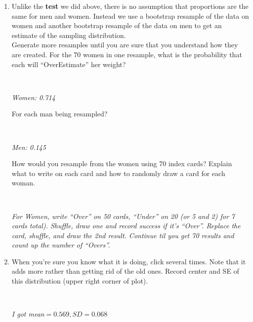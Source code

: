 \begin{enumerate}
\begin{enumerate}
       \item  Unlike the {\bf test} we did above, there is no assumption
         that proportions are the same for men and women.  Instead we
         use a bootstrap resample of the data on women and another bootstrap
         resample of the data on men to get an estimate of the
         sampling distribution. 
            \\  Generate more resamples until you are sure that you
            understand how they are created. For the 70 women in one
            resample, what is the probability that each will 
            ``OverEstimate'' her weight? 
\begin{students}
 \ \   \vspace*{1cm}\\
\end{students}
\begin{key}
  {\it Women: 0.714}\\
\end{key}  
For each man being resampled? 
\begin{students}
 \ \   \vspace*{1cm}\\
\end{students}
\begin{key}
  {\it  Men: 0.145}\\
\end{key} 

         How would you  resample from the women using 70 index cards?  Explain
         what to write on each card and how to randomly draw a card
         for each woman.
\begin{students}
 \ \   \vspace*{1cm}\\
\end{students}
\begin{key}
  {\it For Women, write ``Over'' on 50 cards, ``Under'' on 20  (or 5
    and 2) for 7 cards total). 
    Shuffle, draw one and record success if it's ``Over''.  Replace
    the card, shuffle, and draw the 2nd result. Continue til you get
    70 results and count up the number of ``Overs''.}
\end{key} 

        \item When you're sure you know what it is doing, click
           several times. Note that it
          adds more rather than getting rid of the old ones.
          Record center and SE of this distribution (upper right
          corner of plot).
\begin{students}
 \ \   \vspace*{1cm}\\
\end{students}
\begin{key}
   {\it I got mean$ = 0.569, SD = 0.068$}
\end{key}


\end{enumerate}
\end{enumerate}
